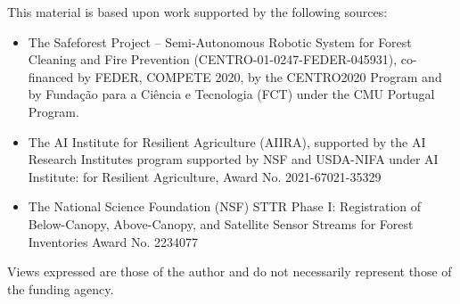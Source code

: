 
\setlength{\parskip}{1em}
\setlength{\parindent}{0em}
This material is based upon work supported by the following sources:
\begin{itemize}
    \item The Safeforest Project – Semi-Autonomous Robotic System for Forest Cleaning and Fire Prevention (CENTRO-01-0247-FEDER-045931), co-financed by FEDER, COMPETE 2020, by the CENTRO2020 Program and by Fundação para a Ciência e Tecnologia (FCT) under the CMU Portugal Program.
    \item The AI Institute for Resilient Agriculture (AIIRA), supported by the AI Research Institutes program supported by NSF and USDA-NIFA under AI Institute: for Resilient Agriculture, Award No. 2021-67021-35329
    \item The National Science Foundation (NSF) STTR Phase I: Registration of Below-Canopy, Above-Canopy, and Satellite Sensor Streams for Forest Inventories Award No. 2234077 
\end{itemize}
Views expressed are those of the author and do not necessarily represent those of the funding agency.
